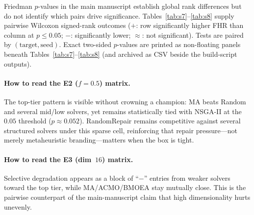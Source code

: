 \documentclass[lettersize,journal,onecolumn]{IEEEtran}
\begin{document}
Friedman $p$-values in the main manuscript establish global rank differences but do not identify which pairs drive significance.
Tables~\ref{tab:s7}--\ref{tab:s8} supply pairwise Wilcoxon signed-rank outcomes
($+$: row significantly higher FHR than column at $p\le 0.05$;
$-$: significantly lower; $\approx$: not significant).
Tests are paired by $(\mathrm{target},\mathrm{seed})$.
Exact two-sided $p$-values are printed as non-floating panels beneath Tables~\ref{tab:s7}--\ref{tab:s8}
(and archived as CSV beside the build-script outputs).

\paragraph{How to read the E2 ($f=0.5$) matrix.}
The top-tier pattern is visible without crowning a champion:
MA beats Random and several mid/low solvers, yet remains statistically tied with NSGA-II at the $0.05$ threshold ($p\approx 0.052$).
RandomRepair remains competitive against several structured solvers under this sparse cell, reinforcing that repair pressure---not merely metaheuristic branding---matters when the box is tight.

\paragraph{How to read the E3 (dim~$16$) matrix.}
Selective degradation appears as a block of ``$-$'' entries from weaker solvers toward the top tier, while MA/ACMO/BMOEA stay mutually close.
This is the pairwise counterpart of the main-manuscript claim that high dimensionality hurts unevenly.

\begin{table}[!t]
\centering
\caption{Pairwise Wilcoxon signed-rank matrix for E2 hardest cell ($f=0.5$).
Reading the MA row: MA is significantly above Random/C-TAEA/Greedy/RVEA/SPEA2/BMOEA,
but \emph{not} significantly separated from NSGA-II or RandomRepair at $p\le 0.05$
(MA vs.\ NSGA-II $p\approx 0.052$).
This pattern supports stable top-tier membership rather than a single universal champion.}
\label{tab:s7}
\scriptsize

\end{table}

\begin{table}[!t]
\centering
\caption{Pairwise Wilcoxon signed-rank matrix for E3 dimension~$16$.
Leading memetic/dominance solvers remain mutually close ($\approx$ among MA/ACMO/BMOEA),
while Random and C-TAEA are significantly below the top tier---consistent with selective high-dimensional degradation.}
\label{tab:s8}
\scriptsize

\end{table}
\end{document}
